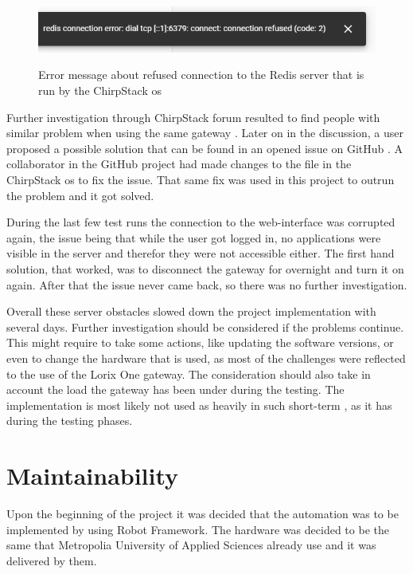 \begin{figure}[ht]
  \centering
  {\includegraphics[width=\textwidth]{illustration/error_when_confirming_device_deleting.PNG}}
  \caption{Error message about refused connection to the Redis server that is run by the ChirpStack \gls{os}}
  \label{fig:error_when_confirming_device_deleting}
\end{figure}

Further investigation through ChirpStack forum resulted to find people with similar problem when using the same gateway \cite{chirpstack_forum:redis_error}.
Later on in the discussion, a user proposed a possible solution that can be found in an opened issue on GitHub \cite{github:redis_issue}.
A collaborator in the GitHub project had made changes to the  file in the ChirpStack \gls{os} to fix the issue.
That same fix was used in this project to outrun the problem and it got solved.

During the last few test runs the connection to the web-interface was corrupted again, the issue being that while the user got logged in, no applications were visible in the server and therefor they were not accessible either.
The first hand solution, that worked, was to disconnect the gateway for overnight and turn it on again.
After that the issue never came back, so there was no further investigation.

Overall these server obstacles slowed down the project implementation with several days.
Further investigation should be considered if the problems continue.
This might require to take some actions, like updating the software versions, or even to change the hardware that is used, as most of the challenges were reflected to the use of the Lorix One gateway.
The consideration should also take in account the load the gateway has been under during the testing.
The implementation is most likely not used as heavily in such short-term , as it has during the testing phases.


\section{Maintainability}
 Upon the beginning of the project it was decided that the automation was to be implemented by using Robot Framework.
 The hardware was decided to be the same that Metropolia University of Applied Sciences already use and it was delivered by them.

